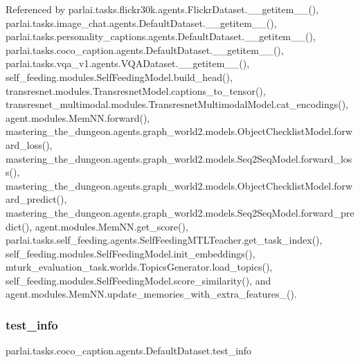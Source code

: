 Referenced by parlai.\+tasks.\+flickr30k.\+agents.\+Flickr\+Dataset.\+\_\+\+\_\+getitem\+\_\+\+\_\+(), parlai.\+tasks.\+image\+\_\+chat.\+agents.\+Default\+Dataset.\+\_\+\+\_\+getitem\+\_\+\+\_\+(), parlai.\+tasks.\+personality\+\_\+captions.\+agents.\+Default\+Dataset.\+\_\+\+\_\+getitem\+\_\+\+\_\+(), parlai.\+tasks.\+coco\+\_\+caption.\+agents.\+Default\+Dataset.\+\_\+\+\_\+getitem\+\_\+\+\_\+(), parlai.\+tasks.\+vqa\+\_\+v1.\+agents.\+V\+Q\+A\+Dataset.\+\_\+\+\_\+getitem\+\_\+\+\_\+(), self\+\_\+feeding.\+modules.\+Self\+Feeding\+Model.\+build\+\_\+head(), transresnet.\+modules.\+Transresnet\+Model.\+captions\+\_\+to\+\_\+tensor(), transresnet\+\_\+multimodal.\+modules.\+Transresnet\+Multimodal\+Model.\+cat\+\_\+encodings(), agent.\+modules.\+Mem\+N\+N.\+forward(), mastering\+\_\+the\+\_\+dungeon.\+agents.\+graph\+\_\+world2.\+models.\+Object\+Checklist\+Model.\+forward\+\_\+loss(), mastering\+\_\+the\+\_\+dungeon.\+agents.\+graph\+\_\+world2.\+models.\+Seq2\+Seq\+Model.\+forward\+\_\+loss(), mastering\+\_\+the\+\_\+dungeon.\+agents.\+graph\+\_\+world2.\+models.\+Object\+Checklist\+Model.\+forward\+\_\+predict(), mastering\+\_\+the\+\_\+dungeon.\+agents.\+graph\+\_\+world2.\+models.\+Seq2\+Seq\+Model.\+forward\+\_\+predict(), agent.\+modules.\+Mem\+N\+N.\+get\+\_\+score(), parlai.\+tasks.\+self\+\_\+feeding.\+agents.\+Self\+Feeding\+M\+T\+L\+Teacher.\+get\+\_\+task\+\_\+index(), self\+\_\+feeding.\+modules.\+Self\+Feeding\+Model.\+init\+\_\+embeddings(), mturk\+\_\+evaluation\+\_\+task.\+worlds.\+Topics\+Generator.\+load\+\_\+topics(), self\+\_\+feeding.\+modules.\+Self\+Feeding\+Model.\+score\+\_\+similarity(), and agent.\+modules.\+Mem\+N\+N.\+update\+\_\+memories\+\_\+with\+\_\+extra\+\_\+features\+\_\+().

\mbox{\label{classparlai_1_1tasks_1_1coco__caption_1_1agents_1_1DefaultDataset_ad68b4e554b8e898aaeec7b2ae55d665f}} 
\subsubsection{\texorpdfstring{test\+\_\+info}{test\_info}}
{\footnotesize\ttfamily parlai.\+tasks.\+coco\+\_\+caption.\+agents.\+Default\+Dataset.\+test\+\_\+info}



